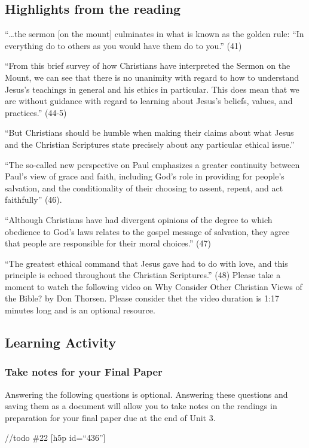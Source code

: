 \documentclass[
]{book}
\begin{document}
\hypertarget{highlights-from-the-reading-6}{%
\subsection*{Highlights from the reading}\label{highlights-from-the-reading-6}}

``\ldots the sermon {[}on the mount{]} culminates in what is known as the golden rule: ``In everything do to others as you would have them do to you.'' (41)

``From this brief survey of how Christians have interpreted the Sermon on the Mount, we can see that there is no unanimity with regard to how to understand Jesus's teachings in general and his ethics in particular. This does mean that we are without guidance with regard to learning about Jesus's beliefs, values, and practices.'' (44-5)

``But Christians should be humble when making their claims about what Jesus and the Christian Scriptures state precisely about any particular ethical issue.''

``The so-called new perspective on Paul emphasizes a greater continuity between Paul's view of grace and faith, including God's role in providing for people's salvation, and the conditionality of their choosing to assent, repent, and act faithfully'' (46).

``Although Christians have had divergent opinions of the degree to which obedience to God's laws relates to the gospel message of salvation, they agree that people are responsible for their moral choices.'' (47)

``The greatest ethical command that Jesus gave had to do with love, and this principle is echoed throughout the Christian Scriptures.'' (48)
Please take a moment to watch the following video on Why Consider Other Christian Views of the Bible? by Don Thorsen. Please consider thet the video duration is 1:17 minutes long and is an optional resource.

\hypertarget{learning-activity-6}{%
\subsection*{Learning Activity}\label{learning-activity-6}}

\begin{reflect}
\hypertarget{take-notes-for-your-final-paper-1}{%
\subsubsection*{Take notes for your Final Paper}\label{take-notes-for-your-final-paper-1}}

Answering the following questions is optional. Answering these questions and saving them as a document will allow you to take notes on the readings in preparation for your final paper due at the end of Unit 3.
\end{reflect}
//todo \#22
{[}h5p id=``436''{]}
\end{document}
